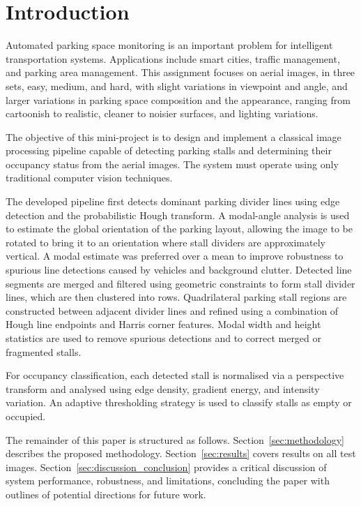 \documentclass[9pt,journal]{IEEEtran}
\begin{document}
	\section{Introduction}
	
	Automated parking space monitoring is an important problem for intelligent transportation systems. Applications include smart cities, traffic management, and parking area management. This assignment focuses on aerial images, in three sets, easy, medium, and hard, with slight variations in viewpoint and angle, and larger variations in parking space composition and the appearance, ranging from cartoonish to realistic, cleaner to noisier surfaces, and lighting variations.

	The objective of this mini-project is to design and implement a classical image processing pipeline capable of detecting parking stalls and determining their occupancy status from the aerial images. The system must operate using only traditional computer vision techniques.
	
	The developed pipeline first detects dominant parking divider lines using edge detection and the probabilistic Hough transform. A modal-angle analysis is used to estimate the global orientation of the parking layout, allowing the image to be rotated to bring it to an orientation where stall dividers are approximately vertical. A modal estimate was preferred over a mean to improve robustness to spurious line detections caused by vehicles and background clutter. Detected line segments are merged and filtered using geometric constraints to form stall divider lines, which are then clustered into rows. Quadrilateral parking stall regions are constructed between adjacent divider lines and refined using a combination of Hough line endpoints and Harris corner features. Modal width and height statistics are used to remove spurious detections and to correct merged or fragmented stalls.
	
	For occupancy classification, each detected stall is normalised via a perspective transform and analysed using edge density, gradient energy, and intensity variation. An adaptive thresholding strategy is used to classify stalls as empty or occupied.
	
	The remainder of this paper is structured as follows. Section~\ref{sec:methodology} describes the proposed methodology. Section~\ref{sec:results} covers results on all test images. Section~\ref{sec:discussion_conclusion} provides a critical discussion of system performance, robustness, and limitations, concluding the paper with outlines of potential directions for future work.
	
\end{document}
